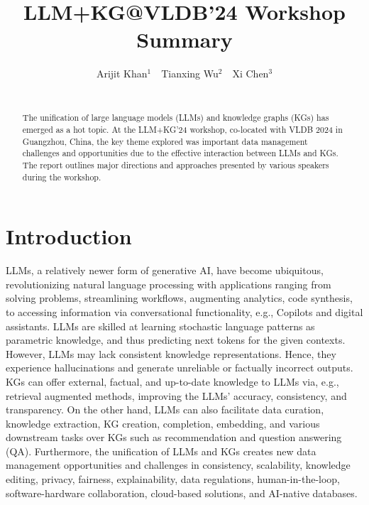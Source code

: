 \documentclass{sig-alternate-10pt}
\begin{document}
\title{LLM+KG@VLDB'24 Workshop Summary}

\author{Arijit Khan$^1$ \,\, Tianxing Wu$^2$ \,\, Xi Chen$^3$  \\
 \\
}



\maketitle


\vspace{-1in}


\begin{abstract}
The unification of large language models (LLMs) and knowledge graphs (KGs) has emerged as a hot
topic. At the LLM+KG’24 workshop, co-located with VLDB 2024 in Guangzhou, China, the key theme explored was important data management challenges and opportunities due to the effective interaction between
LLMs and KGs. The  report outlines major directions and approaches presented by various
speakers during the 
workshop.
\end{abstract}

\vspace{-2mm}
\section{Introduction}
\label{sec:introduction}

\medskip
\medskip

LLMs, a relatively newer form of generative AI, have become ubiquitous, revolutionizing natural language processing with applications ranging from
solving problems, streamlining workflows, augmenting analytics, code synthesis, to accessing information via conversational functionality, e.g., Copilots  and digital assistants. LLMs are skilled at learning stochastic language patterns as parametric knowledge, and thus predicting next tokens for the given contexts. However, LLMs may lack consistent knowledge representations. Hence, they experience hallucinations and generate unreliable or factually incorrect outputs. KGs can offer external, factual, and up-to-date knowledge to LLMs via, e.g., retrieval augmented methods,  improving the
LLMs' accuracy, consistency, and transparency. On the other hand, LLMs can also facilitate data curation, knowledge extraction, KG creation, completion, embedding, and various downstream tasks over KGs such as recommendation and question answering (QA). Furthermore, the unification of LLMs and KGs creates new data management opportunities and challenges in consistency, scalability, knowledge editing, privacy, fairness,
explainability, data regulations, human-in-the-loop, software-hardware collaboration, cloud-based solutions,
and AI-native databases.
\end{document}
